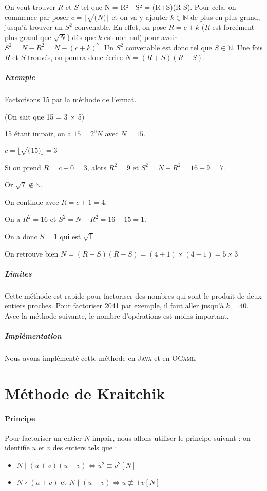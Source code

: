 \documentclass[11pt,a4paper]{article}
\begin{document}
	On veut trouver $R$ et $S$ tel que N = R² - S² = (R+S)(R-S). 
	Pour cela, on commence par poser $c = \lfloor \sqrt(N)\rfloor$ et on va y ajouter $k \in \mathbb{N}$ de plus en plus grand, jusqu'à trouver un $S^2$ convenable. En effet, on pose $R = c + k$ ($R$ est forcément plus grand que  $\sqrt{N}$) dès que $k$ est non nul) pour avoir
	$S^{2} = N - R^{2} = N - (c+k)^{2}$.
	Un $S^2$ convenable est donc tel que $S \in \mathbb{N}$. Une fois $R$ et $S$ trouvés, on pourra donc écrire $N = (R+S)(R-S)$.
	
	\subparagraph{Exemple}
	Factorisons 15 par la méthode de Fermat. 
	
	(On sait que 15 = 3 $\times$  5)

	
	15 étant impair, on a $15 = 2^{0}N$ avec $N = 15$.
	
	$c = \lfloor \sqrt(15)\rfloor = 3$
	
	Si on prend $R = c + 0 = 3$, alors $R^2 = 9$ et $S^2 = N - R^2 = 16 - 9 = 7$. 
	
	Or $\sqrt{7} \not\in \mathbb{N}$. 
	
	On continue avec $R = c + 1 = 4$. 
	
	On a $R^2 = 16$ et $S^2 = N - R^2 = 16 - 15 = 1$.
	
	On a donc $S = 1$ qui est $\sqrt 1$
	
	On retrouve bien $N = (R+S)(R-S) = (4+1) \times (4-1) = 5 \times 3$
	
	\subparagraph{Limites}
	Cette méthode est rapide pour factoriser des nombres qui sont le produit de deux entiers proches. Pour factoriser 2041 par exemple, il faut aller jusqu'à $k = 40$. Avec la méthode suivante, le nombre d'opérations est moins important.
	
	\subparagraph{Implémentation}
	Nous avons implémenté cette méthode en \textsc{Java} et en \textsc{OCaml}.
	
	\newpage
	
	\section{\LARGE{Méthode de Kraitchik}}
	
	\paragraph{Principe}
	Pour factoriser un entier $N$ impair, nous allons utiliser le principe suivant : on identifie $u$ et $v$ des entiers tels que :
	\begin{itemize}
		\item $N \mid(u+v)(u-v) \iff u^2 \equiv v^2 [N]$
		\item $N \nmid(u+v)$ et $ N \nmid(u-v) \iff u \not\equiv \pm v [N]$ 
	\end{itemize}
	
\end{document}
